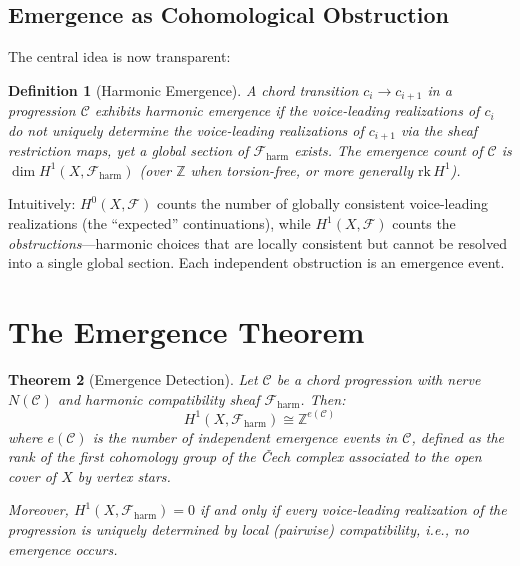 \documentclass[12pt,a4paper]{article}
\newtheorem{theorem}{Theorem}[section]
\newtheorem{definition}[theorem]{Definition}
\newcommand{\ZZ}{\mathbb{Z}}
\newcommand{\Hone}{H^{1}}
\newcommand{\Hzero}{H^{0}}
\newcommand{\sheaf}{\mathscr{F}}
\begin{document}
\subsection{Emergence as Cohomological Obstruction}

The central idea is now transparent:

\begin{definition}[Harmonic Emergence]
  A chord transition $c_i \to c_{i+1}$ in a progression $\mathcal{C}$ exhibits 
  \emph{harmonic emergence} if the voice-leading realizations of $c_i$ do not 
  uniquely determine the voice-leading realizations of $c_{i+1}$ via the sheaf 
  restriction maps, yet a global section of $\sheaf_{\mathrm{harm}}$ exists. 
  The \emph{emergence count} of $\mathcal{C}$ is $\dim \Hone(X, \sheaf_{\mathrm{harm}})$ 
  (over $\ZZ$ when torsion-free, or more generally $\mathrm{rk}\, \Hone$).
\end{definition}

Intuitively: $\Hzero(X, \sheaf)$ counts the number of globally consistent voice-leading 
realizations (the ``expected'' continuations), while $\Hone(X, \sheaf)$ counts the 
\emph{obstructions}---harmonic choices that are locally consistent but cannot be resolved 
into a single global section. Each independent obstruction is an emergence event.

\section{The Emergence Theorem}\label{sec:emergence-theorem}

\begin{theorem}[Emergence Detection]\label{thm:emergence}
  Let $\mathcal{C}$ be a chord progression with nerve $N(\mathcal{C})$ and harmonic 
  compatibility sheaf $\sheaf_{\mathrm{harm}}$. Then:
  \[
    \Hone(X, \sheaf_{\mathrm{harm}}) \cong \ZZ^{e(\mathcal{C})}
  \]
  where $e(\mathcal{C})$ is the number of independent emergence events in $\mathcal{C}$, 
  defined as the rank of the first cohomology group of the \v{C}ech complex associated to 
  the open cover of $X$ by vertex stars.

  Moreover, $\Hone(X, \sheaf_{\mathrm{harm}}) = 0$ if and only if every voice-leading 
  realization of the progression is uniquely determined by local (pairwise) compatibility, 
  i.e., no emergence occurs.
\end{theorem}
\end{document}
